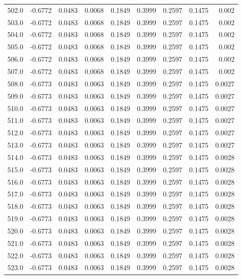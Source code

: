 \begin{longtable}{lrrrrrrrr}
502.0 & -0.6772 & 0.0483 & 0.0068 & 0.1849 & 0.3999 & 0.2597 & 0.1475 & 0.002 \\
503.0 & -0.6772 & 0.0483 & 0.0068 & 0.1849 & 0.3999 & 0.2597 & 0.1475 & 0.002 \\
504.0 & -0.6772 & 0.0483 & 0.0068 & 0.1849 & 0.3999 & 0.2597 & 0.1475 & 0.002 \\
505.0 & -0.6772 & 0.0483 & 0.0068 & 0.1849 & 0.3999 & 0.2597 & 0.1475 & 0.002 \\
506.0 & -0.6772 & 0.0483 & 0.0068 & 0.1849 & 0.3999 & 0.2597 & 0.1475 & 0.002 \\
507.0 & -0.6772 & 0.0483 & 0.0068 & 0.1849 & 0.3999 & 0.2597 & 0.1475 & 0.002 \\
508.0 & -0.6773 & 0.0483 & 0.0063 & 0.1849 & 0.3999 & 0.2597 & 0.1475 & 0.0027 \\
509.0 & -0.6773 & 0.0483 & 0.0063 & 0.1849 & 0.3999 & 0.2597 & 0.1475 & 0.0027 \\
510.0 & -0.6773 & 0.0483 & 0.0063 & 0.1849 & 0.3999 & 0.2597 & 0.1475 & 0.0027 \\
511.0 & -0.6773 & 0.0483 & 0.0063 & 0.1849 & 0.3999 & 0.2597 & 0.1475 & 0.0027 \\
512.0 & -0.6773 & 0.0483 & 0.0063 & 0.1849 & 0.3999 & 0.2597 & 0.1475 & 0.0027 \\
513.0 & -0.6773 & 0.0483 & 0.0063 & 0.1849 & 0.3999 & 0.2597 & 0.1475 & 0.0027 \\
514.0 & -0.6773 & 0.0483 & 0.0063 & 0.1849 & 0.3999 & 0.2597 & 0.1475 & 0.0028 \\
515.0 & -0.6773 & 0.0483 & 0.0063 & 0.1849 & 0.3999 & 0.2597 & 0.1475 & 0.0028 \\
516.0 & -0.6773 & 0.0483 & 0.0063 & 0.1849 & 0.3999 & 0.2597 & 0.1475 & 0.0028 \\
517.0 & -0.6773 & 0.0483 & 0.0063 & 0.1849 & 0.3999 & 0.2597 & 0.1475 & 0.0028 \\
518.0 & -0.6773 & 0.0483 & 0.0063 & 0.1849 & 0.3999 & 0.2597 & 0.1475 & 0.0028 \\
519.0 & -0.6773 & 0.0483 & 0.0063 & 0.1849 & 0.3999 & 0.2597 & 0.1475 & 0.0028 \\
520.0 & -0.6773 & 0.0483 & 0.0063 & 0.1849 & 0.3999 & 0.2597 & 0.1475 & 0.0028 \\
521.0 & -0.6773 & 0.0483 & 0.0063 & 0.1849 & 0.3999 & 0.2597 & 0.1475 & 0.0028 \\
522.0 & -0.6773 & 0.0483 & 0.0063 & 0.1849 & 0.3999 & 0.2597 & 0.1475 & 0.0028 \\
523.0 & -0.6773 & 0.0483 & 0.0063 & 0.1849 & 0.3999 & 0.2597 & 0.1475 & 0.0028 \\

\end{longtable}
